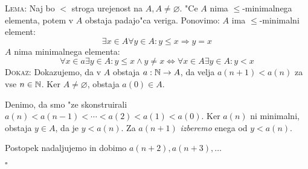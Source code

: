 \textsc{Lema:} Naj bo $<$ stroga urejenost na $A, A\neq \varnothing$. "Ce $A$ nima $\leq$-minimalnega elementa, potem v $A$ obstaja padajo"ca veriga. Ponovimo: $A$ ima $\leq$-minimalni element:
\begin{equation*}
\exists x \in A \forall y \in A: y \leq x \Rightarrow y = x
\end{equation*}
$A$ nima minimalnega elementa:
\begin{equation*}
\forall x \in a \exists y \in A: y \leq x \land y \neq x \iff \forall x \in A \exists y \in A: y < x
\end{equation*}
\textsc{Dokaz:} Dokazujemo, da v $A$ obstaja $a: \mathbb{N} \to A$, da velja $a(n+1) < a(n)$ za vse $n \in \mathbb{N}$. Ker $A \neq \varnothing$, obstaja $a(0) \in A$.

Denimo, da smo "ze skonstruirali $a(n) < a(n-1) < \cdots < a(2) < a(1) < a(0)$. Ker $a(n)$ ni minimalni, obstaja $y \in A$, da je $y < a(n)$. Za $a(n+1)$ \emph{izberemo} enega od $y < a(n)$.

Postopek nadaljujemo in dobimo $a(n+2), a(n+3), \ldots$

\hfill $\square$

